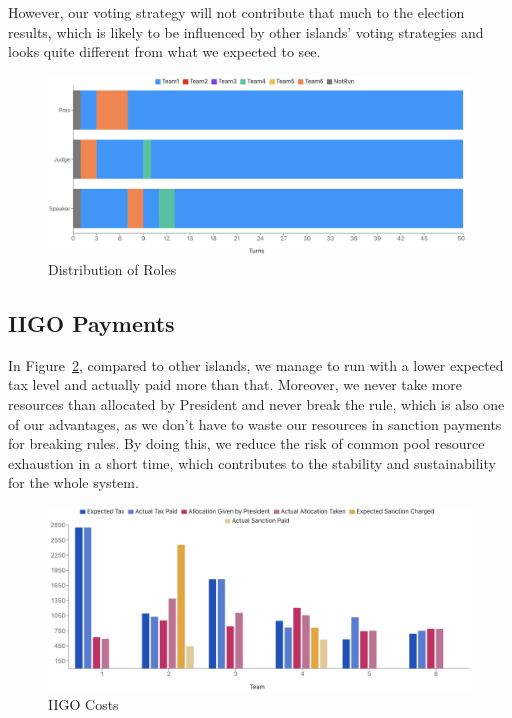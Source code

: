 However, our voting strategy will not contribute that much to the election results, which is likely to be influenced by other islands' voting strategies and looks quite different from what we expected to see.
\begin{figure}[htp]
    \centering
    \includegraphics[width=12cm]{14_team6_agentdesign/images/roles.png}
    \caption{Distribution of Roles}
    \label{fig:roles}
\end{figure}


\subsection{IIGO Payments} \label{subsec:Team6_Eval_IIGO}

In Figure~\ref{fig:IIGO}, compared to other islands, we manage to run with a lower expected tax level and actually paid more than that. Moreover, we never take more resources than allocated by President and never break the rule, which is also one of our advantages, as we don’t have to waste our resources in sanction payments for breaking rules. By doing this, we reduce the risk of common pool resource exhaustion in a short time, which contributes to the stability and sustainability for the whole system.\\
\begin{figure}[htp]
    \centering
    \includegraphics[width=12cm]{14_team6_agentdesign/images/IIGO cost.png}
    \caption{IIGO Costs}
    \label{fig:IIGO}
\end{figure}

